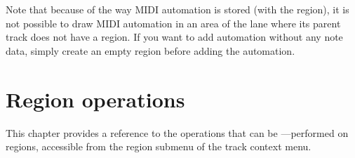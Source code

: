 \documentclass[10pt,a4paper]{book}
\begin{document}
Note that because of the way MIDI automation is stored (with the
region), it is not possible to draw MIDI automation in an area of the
lane where its parent track does not have a region.  If you want to
add automation without any note data, simply create an empty region
before adding the automation.




\chapter{Region operations}
\label{ch:region-operations}

This chapter provides a reference to the operations that can be
---performed on regions, accessible from the region submenu of the track
context menu.
\end{document}
